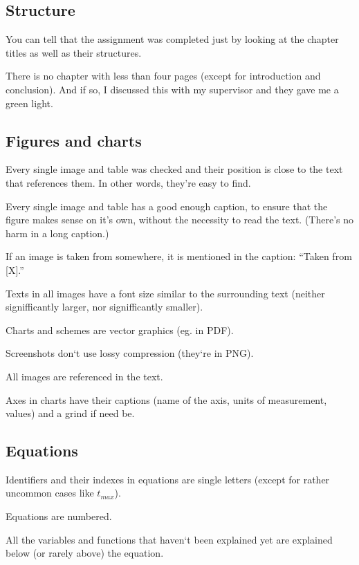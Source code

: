 \subsection*{Structure}
\begin{checklist}
	\item You can tell that the assignment was completed just by looking at the chapter titles as well as their structures.
    \item There is no chapter with less than four pages (except for introduction and conclusion). And if so, I discussed this with my supervisor and they gave me a green light.
\end{checklist}

\subsection*{Figures and charts}
\begin{checklist}
	\item Every single image and table was checked and their position is close to the text that references them. In other words, they’re easy to find.
    \item Every single image and table has a good enough caption, to ensure that the figure makes sense on it’s own, without the necessity to read the text. (There’s no harm in a long caption.)
    \item If an image is taken from somewhere, it is mentioned in the caption: “Taken from [X].”
    \item Texts in all images have a font size similar to the surrounding text (neither signifficantly larger, nor signifficantly smaller).
    \item Charts and schemes are vector graphics (eg. in PDF).
    \item Screenshots don‘t use lossy compression (they‘re in PNG).
    \item All images are referenced in the text.
    \item Axes in charts have their captions (name of the axis, units of measurement, values) and a grind if need be.
\end{checklist}

\subsection*{Equations}
\begin{checklist}
	\item Identifiers and their indexes in equations are single letters (except for rather uncommon cases like $t_{max}$).
    \item Equations are numbered.
    \item All the variables and functions that haven‘t been explained yet are explained below (or rarely above) the equation.
\end{checklist}

